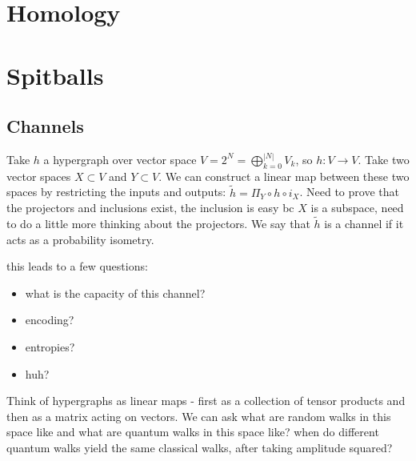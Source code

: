 

\section{Homology}


\section{Spitballs}
\subsection{Channels}
Take $h$ a hypergraph over vector space $V = 2^{N} = \bigoplus_{k=0}^{|N|} V_k$, so $h: V \to V$. Take two vector spaces $X \subset V$ and $Y \subset V$. We can construct a linear map between these two spaces by restricting the inputs and outputs: $\widetilde{h} = \Pi_Y \circ h \circ i_X$. Need to prove that the projectors and inclusions exist, the inclusion is easy bc $X$ is a subspace, need to do a little more thinking about the projectors. We say that $\widetilde{h}$ is a channel if it acts as a probability isometry. 

this leads to a few questions:
\begin{itemize}
    \item what is the capacity of this channel?
    \item encoding?
    \item entropies?
    \item huh?
\end{itemize}


Think of hypergraphs as linear maps - first as a collection of tensor products and then as a matrix acting on vectors. We can ask what are random walks in this space like and what are quantum walks in this space like? when do different quantum walks yield the same classical walks, after taking amplitude squared?

